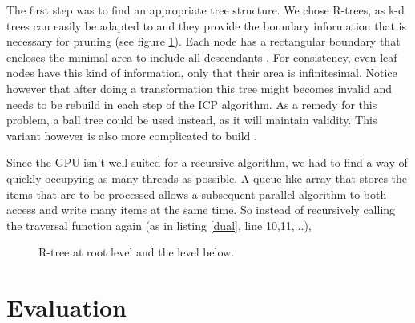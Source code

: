 \documentclass{utue} %
\begin{document}
The first step was to find an appropriate tree structure. We chose R-trees, as k-d trees can easily be adapted to and they provide the boundary information that is necessary for pruning (see figure \ref{rtree}). Each node has a rectangular boundary that encloses the minimal area to include all descendants \cite{rtree}. For consistency, even leaf nodes have this kind of information, only that their area is infinitesimal. Notice however that after doing a transformation this tree might becomes invalid and needs to be rebuild in each step of the ICP algorithm. As a remedy for this problem, a ball tree could be used instead, as it will maintain validity. This variant however is also more complicated to build \cite{balltree}.

Since the GPU isn't well suited for a recursive algorithm, we had to find a way of quickly occupying as many threads as possible. A queue-like array that stores the items that are to be processed allows a subsequent parallel algorithm to both access and write many items at the same time. So instead of recursively calling the traversal function again (as in listing \ref{dual}, line 10,11,...),
\begin{figure}[h]
	\begin{subfigure}{.24\textwidth}
	\end{subfigure}
	\begin{subfigure}{.24\textwidth}
	\end{subfigure}
	\caption{R-tree at root level and the level below.}
	\label{rtree}
\end{figure}


\section{Evaluation}
\end{document}
